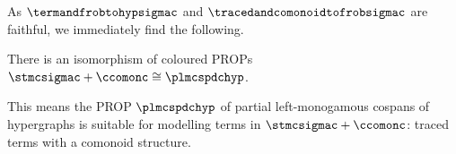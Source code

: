 As \(\termandfrobtohypsigmac\) and \(\tracedandcomonoidtofrobsigmac\) are
faithful, we immediately find the following.

\begin{corollary}
    There is an isomorphism of coloured PROPs
    \(\stmcsigmac + \ccomonc \cong \plmcspdchyp\).
\end{corollary}

This means the PROP \(\plmcspdchyp\) of partial left-monogamous cospans of
hypergraphs is suitable for modelling terms in \(\stmcsigmac + \ccomonc\):
traced terms with a comonoid structure.